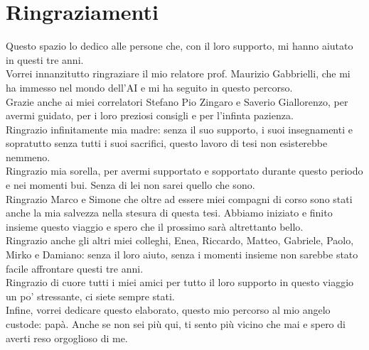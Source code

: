 \documentclass[12pt,a4paper]{report}
\begin{document}
\chapter*{Ringraziamenti}
Questo spazio lo dedico alle persone che, con il loro supporto, mi hanno aiutato in questi tre anni.\\
Vorrei innanzitutto ringraziare il mio relatore prof. Maurizio Gabbrielli, che mi ha immesso nel mondo dell'AI e mi ha seguito in questo percorso.\\
Grazie anche ai miei correlatori Stefano Pio Zingaro e Saverio Giallorenzo, per avermi guidato, per i loro preziosi consigli e per l'infinta pazienza.\\
Ringrazio infinitamente mia madre: senza il suo supporto, i suoi insegnamenti e sopratutto senza tutti i suoi sacrifici, questo lavoro di tesi non esisterebbe nemmeno.\\
Ringrazio mia sorella, per avermi supportato e sopportato durante questo periodo e nei momenti bui. Senza di lei non sarei quello che sono.\\
Ringrazio Marco e Simone che oltre ad essere miei compagni di corso sono stati anche la mia salvezza nella stesura di questa tesi. Abbiamo iniziato e finito insieme questo viaggio e spero che il prossimo sarà altrettanto bello.\\
Ringrazio anche gli altri miei colleghi, Enea, Riccardo, Matteo, Gabriele, Paolo, Mirko e Damiano: senza il loro aiuto, senza i momenti insieme non sarebbe stato facile affrontare questi tre anni.\\
Ringrazio di cuore tutti i miei amici per tutto il loro supporto in questo viaggio un po' stressante, ci siete sempre stati.\\
Infine, vorrei dedicare questo elaborato, questo mio percorso al mio angelo custode: papà. Anche se non sei più qui, ti sento più vicino che mai e spero di averti reso orgoglioso di me.\\
\end{document}
